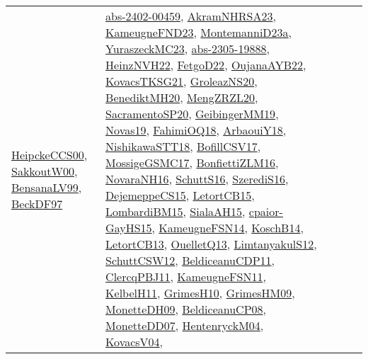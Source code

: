 {\begin{longtable}{lp{3cm}>{\raggedright}p{6cm}>{\raggedright}p{6cm}p{8cm}}
\href{articles/HeipckeCCS00.pdf}{HeipckeCCS00}\cite{HeipckeCCS00}, \href{articles/SakkoutW00.pdf}{SakkoutW00}\cite{SakkoutW00}, \href{articles/BensanaLV99.pdf}{BensanaLV99}\cite{BensanaLV99}, \href{papers/BeckDF97.pdf}{BeckDF97}\cite{BeckDF97} & \href{articles/abs-2402-00459.pdf}{abs-2402-00459}\cite{abs-2402-00459}, \href{articles/AkramNHRSA23.pdf}{AkramNHRSA23}\cite{AkramNHRSA23}, \href{papers/KameugneFND23.pdf}{KameugneFND23}\cite{KameugneFND23}, \href{articles/MontemanniD23a.pdf}{MontemanniD23a}\cite{MontemanniD23a}, \href{papers/YuraszeckMC23.pdf}{YuraszeckMC23}\cite{YuraszeckMC23}, \href{articles/abs-2305-19888.pdf}{abs-2305-19888}\cite{abs-2305-19888}, \href{articles/HeinzNVH22.pdf}{HeinzNVH22}\cite{HeinzNVH22}, \href{articles/FetgoD22.pdf}{FetgoD22}\cite{FetgoD22}, \href{papers/OujanaAYB22.pdf}{OujanaAYB22}\cite{OujanaAYB22}, \href{papers/KovacsTKSG21.pdf}{KovacsTKSG21}\cite{KovacsTKSG21}, \href{papers/GroleazNS20.pdf}{GroleazNS20}\cite{GroleazNS20}, \href{articles/BenediktMH20.pdf}{BenediktMH20}\cite{BenediktMH20}, \href{articles/MengZRZL20.pdf}{MengZRZL20}\cite{MengZRZL20}, \href{articles/SacramentoSP20.pdf}{SacramentoSP20}\cite{SacramentoSP20}, \href{papers/GeibingerMM19.pdf}{GeibingerMM19}\cite{GeibingerMM19}, \href{articles/Novas19.pdf}{Novas19}\cite{Novas19}, \href{articles/FahimiOQ18.pdf}{FahimiOQ18}\cite{FahimiOQ18}, \href{papers/ArbaouiY18.pdf}{ArbaouiY18}\cite{ArbaouiY18}, \href{papers/NishikawaSTT18.pdf}{NishikawaSTT18}\cite{NishikawaSTT18}, \href{papers/BofillCSV17.pdf}{BofillCSV17}\cite{BofillCSV17}, \href{papers/MossigeGSMC17.pdf}{MossigeGSMC17}\cite{MossigeGSMC17}, \href{papers/BonfiettiZLM16.pdf}{BonfiettiZLM16}\cite{BonfiettiZLM16}, \href{articles/NovaraNH16.pdf}{NovaraNH16}\cite{NovaraNH16}, \href{papers/SchuttS16.pdf}{SchuttS16}\cite{SchuttS16}, \href{papers/SzerediS16.pdf}{SzerediS16}\cite{SzerediS16}, \href{papers/DejemeppeCS15.pdf}{DejemeppeCS15}\cite{DejemeppeCS15}, \href{articles/LetortCB15.pdf}{LetortCB15}\cite{LetortCB15}, \href{papers/LombardiBM15.pdf}{LombardiBM15}\cite{LombardiBM15}, \href{papers/SialaAH15.pdf}{SialaAH15}\cite{SialaAH15}, \href{papers/cpaior-GayHS15.pdf}{cpaior-GayHS15}\cite{cpaior-GayHS15}, \href{articles/KameugneFSN14.pdf}{KameugneFSN14}\cite{KameugneFSN14}, \href{papers/KoschB14.pdf}{KoschB14}\cite{KoschB14}, \href{papers/LetortCB13.pdf}{LetortCB13}\cite{LetortCB13}, \href{papers/OuelletQ13.pdf}{OuelletQ13}\cite{OuelletQ13}, \href{articles/LimtanyakulS12.pdf}{LimtanyakulS12}\cite{LimtanyakulS12}, \href{papers/SchuttCSW12.pdf}{SchuttCSW12}\cite{SchuttCSW12}, \href{articles/BeldiceanuCDP11.pdf}{BeldiceanuCDP11}\cite{BeldiceanuCDP11}, \href{papers/ClercqPBJ11.pdf}{ClercqPBJ11}\cite{ClercqPBJ11}, \href{papers/KameugneFSN11.pdf}{KameugneFSN11}\cite{KameugneFSN11}, \href{articles/KelbelH11.pdf}{KelbelH11}\cite{KelbelH11}, \href{papers/GrimesH10.pdf}{GrimesH10}\cite{GrimesH10}, \href{papers/GrimesHM09.pdf}{GrimesHM09}\cite{GrimesHM09}, \href{papers/MonetteDH09.pdf}{MonetteDH09}\cite{MonetteDH09}, \href{papers/BeldiceanuCP08.pdf}{BeldiceanuCP08}\cite{BeldiceanuCP08}, \href{papers/MonetteDD07.pdf}{MonetteDD07}\cite{MonetteDD07}, \href{papers/HentenryckM04.pdf}{HentenryckM04}\cite{HentenryckM04}, \href{papers/KovacsV04.pdf}{KovacsV04}\cite{KovacsV04}, 
\end{longtable}}
